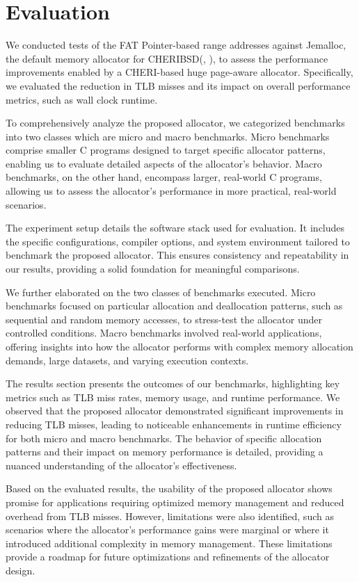 \documentclass[11pt]{article}
\author{Akilan}
\date{\today}
\title{}
\begin{document}
\tableofcontents

\section{Evaluation}
\label{sec:orgbbe52ec}

We conducted tests of the FAT Pointer-based range addresses against Jemalloc, 
the default memory allocator for CHERIBSD(, ), to assess the performance improvements 
enabled by a CHERI-based huge page-aware allocator. Specifically, we evaluated 
the reduction in TLB misses and its impact on overall 
performance metrics, such as wall clock runtime.

To comprehensively analyze the proposed allocator, we categorized benchmarks into 
two classes which are micro and macro benchmarks. Micro benchmarks comprise smaller 
C programs designed to target specific allocator patterns, enabling us to evaluate 
detailed aspects of the allocator's behavior. Macro benchmarks, on the other hand, 
encompass larger, real-world C programs, allowing us to assess the allocator's 
performance in more practical, real-world scenarios.

The experiment setup details the software stack used for evaluation. It includes 
the specific configurations, compiler options, and system environment tailored 
to benchmark the proposed allocator. This ensures consistency and repeatability 
in our results, providing a solid foundation for meaningful comparisons.

We further elaborated on the two classes of benchmarks executed. Micro benchmarks 
focused on particular allocation and deallocation patterns, such as sequential and 
random memory accesses, to stress-test the allocator under controlled conditions. 
Macro benchmarks involved real-world applications, offering insights into how 
the allocator performs with complex memory allocation demands, large datasets, 
and varying execution contexts.

The results section presents the outcomes of our benchmarks, highlighting key metrics 
such as TLB miss rates, memory usage, and runtime performance. We observed that the 
proposed allocator demonstrated significant improvements in reducing TLB misses, 
leading to noticeable enhancements in runtime efficiency for both micro and macro 
benchmarks. The behavior of specific allocation patterns and their impact on memory 
performance is detailed, providing a nuanced understanding of the allocator's effectiveness.

Based on the evaluated results, the usability of the proposed allocator shows promise 
for applications requiring optimized memory management and reduced overhead from TLB misses.
However, limitations were also identified, such as scenarios where the allocator's performance 
gains were marginal or where it introduced additional complexity in memory management. These 
limitations provide a roadmap for future optimizations and refinements of the allocator design.
\end{document}
